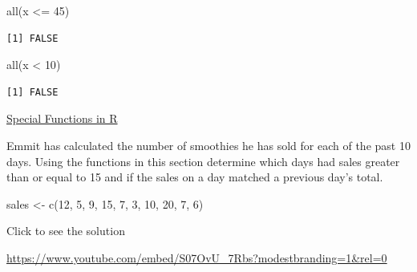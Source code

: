 \documentclass[
  letterpaper,
  DIV=11,
  numbers=noendperiod]{scrreprt}
\newenvironment{Shaded}{\begin{snugshade}}{\end{snugshade}}
\newcommand{\DecValTok}[1]{\textcolor[rgb]{0.68,0.00,0.00}{#1}}
\newcommand{\FunctionTok}[1]{\textcolor[rgb]{0.28,0.35,0.67}{#1}}
\newcommand{\NormalTok}[1]{\textcolor[rgb]{0.00,0.23,0.31}{#1}}
\newcommand{\OtherTok}[1]{\textcolor[rgb]{0.00,0.23,0.31}{#1}}
\newcommand{\SpecialCharTok}[1]{\textcolor[rgb]{0.37,0.37,0.37}{#1}}
\begin{document}
\begin{Shaded}
\begin{Highlighting}[]
\FunctionTok{all}\NormalTok{(x }\SpecialCharTok{\textless{}=} \DecValTok{45}\NormalTok{)}
\end{Highlighting}
\end{Shaded}

\begin{verbatim}
[1] FALSE
\end{verbatim}

\begin{Shaded}
\begin{Highlighting}[]
\FunctionTok{all}\NormalTok{(x }\SpecialCharTok{\textless{}} \DecValTok{10}\NormalTok{)}
\end{Highlighting}
\end{Shaded}

\begin{verbatim}
[1] FALSE
\end{verbatim}

\begin{watch}{}{}
    \href{https://youtu.be/46XJpsU2A6k}{Special Functions in R}
\end{watch}

\begin{tcolorbox}[enhanced jigsaw, leftrule=.75mm, arc=.35mm, coltitle=black, rightrule=.15mm, bottomrule=.15mm, toprule=.15mm, left=2mm, colbacktitle=quarto-callout-tip-color!10!white, title=\textcolor{quarto-callout-tip-color}{\faLightbulb}\hspace{0.5em}{Try it Out}, toptitle=1mm, breakable, colframe=quarto-callout-tip-color-frame, bottomtitle=1mm, titlerule=0mm, colback=white, opacityback=0, opacitybacktitle=0.6]

Emmit has calculated the number of smoothies he has sold for each of the
past 10 days. Using the functions in this section determine which days
had sales greater than or equal to 15 and if the sales on a day matched
a previous day's total.

\begin{Shaded}
\begin{Highlighting}[]
\NormalTok{sales }\OtherTok{\textless{}{-}} \FunctionTok{c}\NormalTok{(}\DecValTok{12}\NormalTok{, }\DecValTok{5}\NormalTok{, }\DecValTok{9}\NormalTok{, }\DecValTok{15}\NormalTok{, }\DecValTok{7}\NormalTok{, }\DecValTok{3}\NormalTok{, }\DecValTok{10}\NormalTok{, }\DecValTok{20}\NormalTok{, }\DecValTok{7}\NormalTok{, }\DecValTok{6}\NormalTok{)}
\end{Highlighting}
\end{Shaded}

Click to see the solution

\url{https://www.youtube.com/embed/S07OvU_7Rbs?modestbranding=1&rel=0}

\end{tcolorbox}
\end{document}

